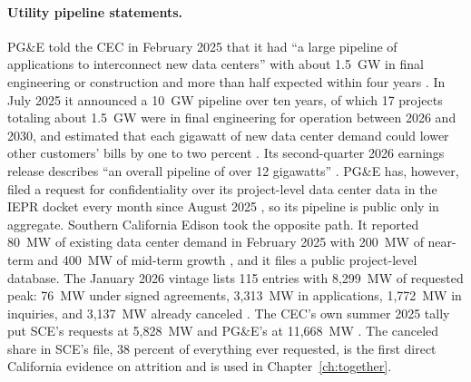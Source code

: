 \paragraph{Utility pipeline statements.} PG\&E told the CEC in February 2025 that it had ``a large pipeline of applications to interconnect new data centers'' with about 1.5~GW in final engineering or construction and more than half expected within four years \citep{pge_iepr2025}. In July 2025 it announced a 10~GW pipeline over ten years, of which 17 projects totaling about 1.5~GW were in final engineering for operation between 2026 and 2030, and estimated that each gigawatt of new data center demand could lower other customers' bills by one to two percent \citep{pge_press2025}. Its second-quarter 2026 earnings release describes ``an overall pipeline of over 12 gigawatts'' \citep{pge_8k2026}. PG\&E has, however, filed a request for confidentiality over its project-level data center data in the IEPR docket every month since August 2025 \citep{pge_confidentiality}, so its pipeline is public only in aggregate. Southern California Edison took the opposite path. It reported 80~MW of existing data center demand in February 2025 with 200~MW of near-term and 400~MW of mid-term growth \citep{sce_iepr2025}, and it files a public project-level database. The January 2026 vintage lists 115 entries with 8,299~MW of requested peak: 76~MW under signed agreements, 3,313~MW in applications, 1,772~MW in inquiries, and 3,137~MW already canceled \citep{sce_database2026}. The CEC's own summer 2025 tally put SCE's requests at 5,828~MW and PG\&E's at 11,668~MW \citep{cec_prelim2025}. The canceled share in SCE's file, 38 percent of everything ever requested, is the first direct California evidence on attrition and is used in Chapter~\ref{ch:together}.

